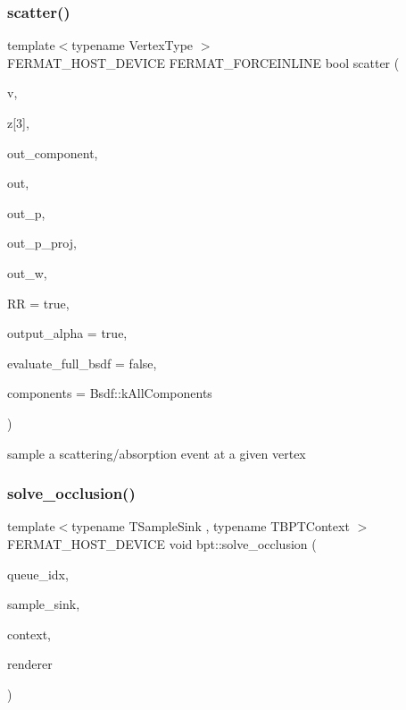 \subsubsection{\texorpdfstring{scatter()}{scatter()}}
{\footnotesize\ttfamily template$<$typename Vertex\+Type $>$ \\
F\+E\+R\+M\+A\+T\+\_\+\+H\+O\+S\+T\+\_\+\+D\+E\+V\+I\+CE F\+E\+R\+M\+A\+T\+\_\+\+F\+O\+R\+C\+E\+I\+N\+L\+I\+NE bool scatter (\begin{DoxyParamCaption}\item[{const Vertex\+Type \&}]{v,  }\item[{const float}]{z\mbox{[}3\mbox{]},  }\item[{\hyperlink{struct_bsdf_a5f7db6f81220ed9ee6da109d6eb5b585}{Bsdf\+::\+Component\+Type} \&}]{out\+\_\+component,  }\item[{\hyperlink{structcugar_1_1_vector}{cugar\+::\+Vector3f} \&}]{out,  }\item[{float \&}]{out\+\_\+p,  }\item[{float \&}]{out\+\_\+p\+\_\+proj,  }\item[{\hyperlink{structcugar_1_1_vector}{cugar\+::\+Vector3f} \&}]{out\+\_\+w,  }\item[{bool}]{RR = {\ttfamily true},  }\item[{bool}]{output\+\_\+alpha = {\ttfamily true},  }\item[{bool}]{evaluate\+\_\+full\+\_\+bsdf = {\ttfamily false},  }\item[{\hyperlink{struct_bsdf_a5f7db6f81220ed9ee6da109d6eb5b585}{Bsdf\+::\+Component\+Type}}]{components = {\ttfamily Bsdf\+:\+:kAllComponents} }\end{DoxyParamCaption})}

\begin{DoxyParagraph}{}
sample a scattering/absorption event at a given vertex 
\end{DoxyParagraph}
\mbox{\label{group___b_p_t_lib_core_ga588188b86e2afbe1f62d1bdd7a145cbf}} 
\subsubsection{\texorpdfstring{solve\+\_\+occlusion()}{solve\_occlusion()}}
{\footnotesize\ttfamily template$<$typename T\+Sample\+Sink , typename T\+B\+P\+T\+Context $>$ \\
F\+E\+R\+M\+A\+T\+\_\+\+H\+O\+S\+T\+\_\+\+D\+E\+V\+I\+CE void bpt\+::solve\+\_\+occlusion (\begin{DoxyParamCaption}\item[{const uint32}]{queue\+\_\+idx,  }\item[{T\+Sample\+Sink \&}]{sample\+\_\+sink,  }\item[{T\+B\+P\+T\+Context \&}]{context,  }\item[{\hyperlink{struct_rendering_context_view}{Rendering\+Context\+View} \&}]{renderer }\end{DoxyParamCaption})}

